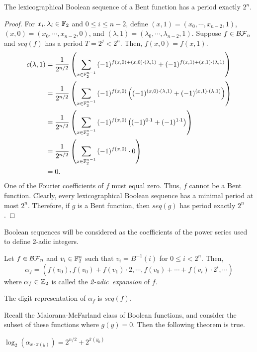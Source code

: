 \begin{theorem}
  The lexicographical Boolean sequence of a Bent function has a period
  exactly $2^n$.
\end{theorem}
\begin{proof}
  For $x_i,\lambda_i\in\mathbb{F}_2$ and $0\leq i\leq n-2$, define
  $(x,1)=\allowbreak(x_0,\cdots,\allowbreak x_{n-2},1)$,
  $(x,0)=\allowbreak(x_0,\cdots,\allowbreak x_{n-2},0)$, and
  $(\lambda,1)=\allowbreak(\lambda_0,\cdots,\allowbreak \lambda_{n-2},1)$.
  Suppose $f\in\mathcal{BF}_n$ and $seq(f)$ has a period $T=2^j<2^n$. Then,
  $f(x,0)=f(x,1)$.
  \begin{align*}
    c(\lambda,1)&=\frac{1}{2^{n/2}}
      \left(\sum_{x\in\mathbb{F}_2^{n-1}}
        {(-1)^{f(x,0)+(x,0)\cdot(\lambda,1)}+
        (-1)^{f(x,1)+(x,1)\cdot(\lambda,1)}}
      \right)\\
    &=\frac{1}{2^{n/2}}
      \left(\sum_{x\in\mathbb{F}_2^{n-1}}
        {(-1)^{f(x,0)}\left((-1)^{(x,0)\cdot(\lambda,1)}+
        (-1)^{(x,1)\cdot(\lambda,1)}\right)}
      \right)\\
    &=\frac{1}{2^{n/2}}
      \left(\sum_{x\in\mathbb{F}_2^{n-1}}
      {(-1)^{f(x,0)}\left((-1)^{0\cdot1}+(-1)^{1\cdot1}\right)}
      \right)\\
    &=\frac{1}{2^{n/2}}
      \left(\sum_{x\in\mathbb{F}_2^{n-1}}{(-1)^{f(x,0)}\cdot0}\right)\\
    &=0.
  \end{align*}
  One of the Fourier coefficients of $f$ must equal zero. Thus, $f$ cannot
  be a Bent function. Clearly, every lexicographical Boolean sequence has a
  minimal period at most $2^n$. Therefore, if $g$ is a Bent function, then
  $seq(g)$ has period exactly $2^n$.
\end{proof}

\par Boolean sequences will be considered as the coefficients of the power
series used to define 2-adic integers.

\begin{definition}\label{2-adic-ex}
  Let $f\in\mathcal{BF}_n$ and $v_i\in\mathbb{F}_2^n$ such that $v_i=B^{-1}(i)$ for
  $0\leq i<2^n$. Then,
  \begin{equation}
    \alpha_f=(f(v_0),f(v_0)+f(v_1)\cdot2,\cdots,\allowbreak
      f(v_0)+\cdots\allowbreak+f(v_i)\cdot2^i,\allowbreak\cdots)
  \end{equation}
  where $\alpha_f\in\mathbb{Z}_2$ is called the {\em 2-adic\ expansion} of $f$.
\end{definition}

\begin{lemma}
  The digit representation of $\alpha_f$ is $seq(f)$.
\end{lemma}



\par Recall the Maiorana-McFarland class of Boolean functions, and consider
the subset of these functions where $g(y)=0$. Then the following theorem is
true.

\begin{theorem}
  $\log_2(\alpha_{x\cdot\pi(y)})=2^{n/2}+2^{\bar{\pi}(y_0)}$
\end{theorem}
